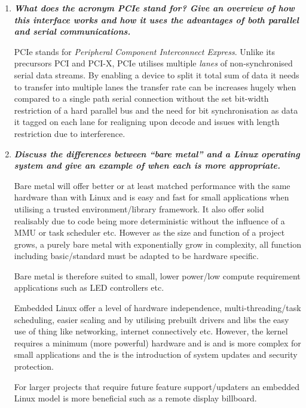 \documentclass[11pt]{article}
\begin{document}
\begin{preview}
\begin{enumerate}
    \item \textit{\textbf{What does the acronym PCIe stand for? Give an overview of how this interface works and how it uses the advantages of both parallel and serial communications.}}
    
    PCIe stands for \textit{Peripheral Component Interconnect Express}. Unlike its precursors PCI and PCI-X, PCIe utilises multiple \textit{lanes} of non-synchronised serial data streams. By enabling a device to split it total sum of data it needs to transfer into multiple lanes the transfer rate can be increases hugely when compared to a single path serial connection without the set bit-width restriction of a hard parallel bus and the need for bit synchronisation as data it tagged on each lane for realigning upon decode and issues with length restriction due to interference.
    
    \item \textit{\textbf{Discuss the differences between “bare metal” and a Linux operating system and give an example of when each is more appropriate.}}

    Bare metal will offer better or at least matched performance with the same hardware than with Linux and is easy and fast for small applications when utilising a trusted environment/library framework. It also offer solid realisably due to code being more deterministic without the influence of a MMU or task scheduler etc. However as the size and function of a project grows, a purely bare metal with exponentially grow in complexity, all function including basic/standard must be adapted to be hardware specific.
    
    Bare metal is therefore suited to small, lower power/low compute requirement applications such as LED controllers etc.

    Embedded Linux offer a level of hardware independence, multi-threading/task scheduling, easier scaling and by utilising prebuilt drivers and libs the easy use of thing like networking, internet connectively etc. However, the kernel requires a minimum (more powerful) hardware and is and is more complex for small applications and the is the introduction of system updates and security protection.

    For larger projects that require future feature support/updaters an embedded Linux model is more beneficial such as a remote display billboard.

\end{enumerate}

\end{preview}
\end{document}
